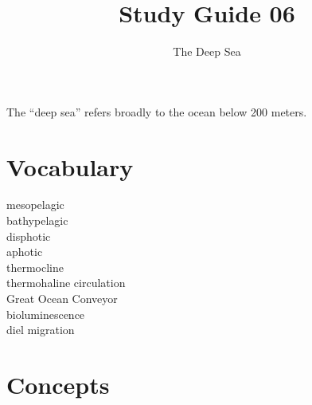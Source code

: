 \documentclass[nofonts, letterpaper]{tufte-handout}
\title{Study Guide 06}
\author{The Deep Sea}
\date{} %
\begin{document}
\maketitle	%

The “deep sea” refers broadly to the ocean below 200 meters.

\section{Vocabulary}
\vspace{-1\baselineskip}
\begin{multicols}{2}
mesopelagic \\
bathypelagic \\
disphotic \\
aphotic \\
thermocline \\
thermohaline circulation \\
Great Ocean Conveyor \\
bioluminescence \\
diel migration
\end{multicols}

\section{Concepts}
\end{document}
